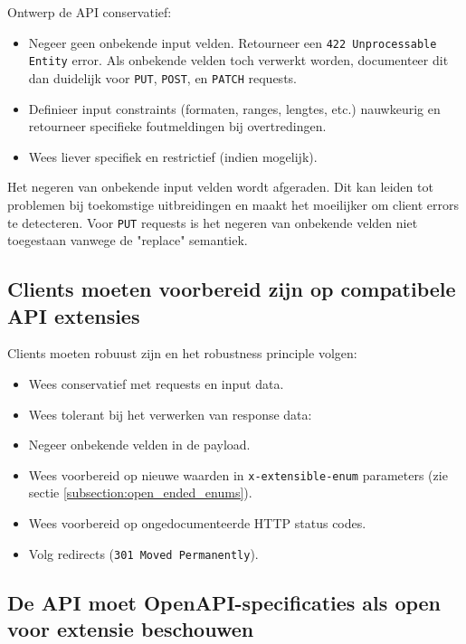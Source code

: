 Ontwerp de API conservatief:

\begin{itemize}
    \item Negeer geen onbekende input velden. Retourneer een \texttt{422 Unprocessable Entity} error. Als onbekende velden toch verwerkt worden, documenteer dit dan duidelijk voor \texttt{PUT}, \texttt{POST}, en \texttt{PATCH} requests.
    \item Definieer input constraints (formaten, ranges, lengtes, etc.) nauwkeurig en retourneer specifieke foutmeldingen bij overtredingen.
    \item Wees liever specifiek en restrictief (indien mogelijk).
\end{itemize}

Het negeren van onbekende input velden wordt afgeraden. Dit kan leiden tot problemen bij toekomstige uitbreidingen en maakt het moeilijker om client errors te detecteren. Voor \texttt{PUT} requests is het negeren van onbekende velden niet toegestaan vanwege de "replace" semantiek.

\subsection{Clients moeten voorbereid zijn op compatibele API extensies}
\label{subsection:client_compatibiliteit}

Clients moeten robuust zijn en het robustness principle volgen:

\begin{itemize}
    \item Wees conservatief met requests en input data.
    \item Wees tolerant bij het verwerken van response data:
    \item Negeer onbekende velden in de payload.
    \item Wees voorbereid op nieuwe waarden in \texttt{x-extensible-enum} parameters (zie sectie \ref{subsection:open_ended_enums}).
    \item Wees voorbereid op ongedocumenteerde HTTP status codes.
    \item Volg redirects (\texttt{301 Moved Permanently}).
\end{itemize}

\subsection{De API moet OpenAPI-specificaties als open voor extensie beschouwen}
\label{subsection:openapi_extensie}

